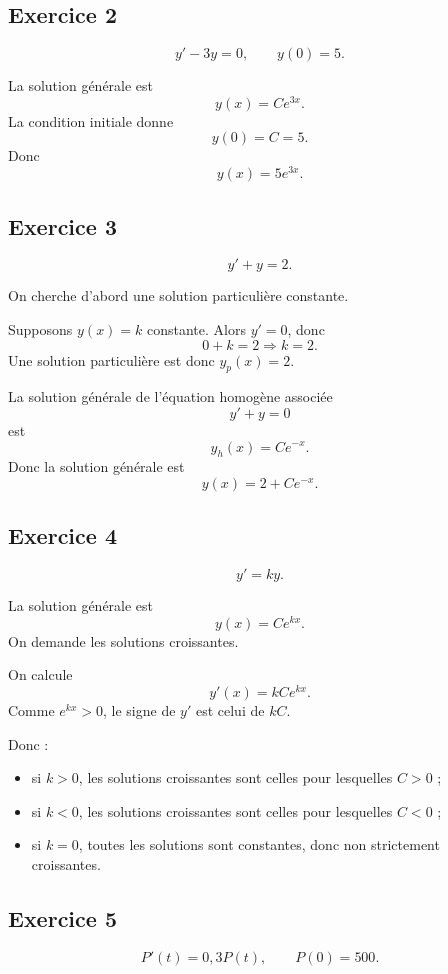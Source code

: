 \documentclass[11pt,a4paper]{article}
\begin{document}
\subsection*{Exercice 2}
\[
y'-3y=0,\qquad y(0)=5.
\]

La solution générale est
\[
y(x)=Ce^{3x}.
\]
La condition initiale donne
\[
y(0)=C=5.
\]
Donc
\[
\boxed{y(x)=5e^{3x}.}
\]

\subsection*{Exercice 3}
\[
y'+y=2.
\]

\begin{methodebox}
On cherche d'abord une solution particulière constante.
\end{methodebox}

Supposons \(y(x)=k\) constante. Alors \(y'=0\), donc
\[
0+k=2 \Rightarrow k=2.
\]
Une solution particulière est donc \(y_p(x)=2\).

La solution générale de l'équation homogène associée
\[
y'+y=0
\]
est
\[
y_h(x)=Ce^{-x}.
\]
Donc la solution générale est
\[
\boxed{y(x)=2+Ce^{-x}.}
\]

\subsection*{Exercice 4}
\[
y'=ky.
\]

La solution générale est
\[
y(x)=Ce^{kx}.
\]
On demande les solutions croissantes.

On calcule
\[
y'(x)=kCe^{kx}.
\]
Comme \(e^{kx}>0\), le signe de \(y'\) est celui de \(kC\).

Donc :
\begin{itemize}
    \item si \(k>0\), les solutions croissantes sont celles pour lesquelles \(C>0\) ;
    \item si \(k<0\), les solutions croissantes sont celles pour lesquelles \(C<0\) ;
    \item si \(k=0\), toutes les solutions sont constantes, donc non strictement croissantes.
\end{itemize}

\subsection*{Exercice 5}
\[
P'(t)=0{,}3P(t),\qquad P(0)=500.
\]
\end{document}
